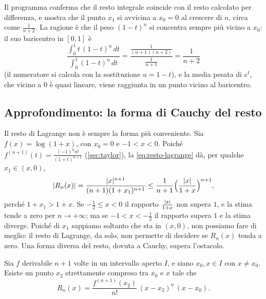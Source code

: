 Il programma conferma che il resto integrale coincide con il resto calcolato per
differenza, e mostra che il punto $x_{1}$ si avvicina a $x_{0}=0$ al crescere di $n$, circa
come $\frac1{n+2}$. La ragione è che il peso $(1-t)^{n}$ si concentra sempre più vicino a $x_{0}$:
il suo baricentro in $[0,1]$ è
\[
  \frac{\int_{0}^{1}t\,(1-t)^{n}\,dt}{\int_{0}^{1}(1-t)^{n}\,dt}=\frac{\frac1{(n+1)(n+2)}}{\frac1{n+1}}=\frac1{n+2}
\]
(il numeratore si calcola con la sostituzione $u=1-t$), e la media pesata di $e^{t}$, che
vicino a $0$ è quasi lineare, viene raggiunta in un punto vicino al baricentro.

\subsection{Approfondimento: la forma di Cauchy del resto}
\label{subsec:resto-cauchy}

Il resto di Lagrange non è sempre la forma più conveniente. Sia $f(x)=\log(1+x)$, con
$x_{0}=0$ e $-1<x<0$. Poiché $f^{(n+1)}(t)=\frac{(-1)^{n}n!}{(1+t)^{n+1}}$ (\cref{sec:taylor}), la
\eqref{eq:resto-lagrange} dà, per qualche $x_{1}\in(x,0)$,
\[
  \lvert R_{n}(x)\rvert=\frac{\lvert x\rvert^{n+1}}{(n+1)(1+x_{1})^{n+1}}
  \le\frac1{n+1}\Bigl(\frac{\lvert x\rvert}{1+x}\Bigr)^{n+1} ,
\]
perché $1+x_{1}>1+x$. Se $-\frac12\le x<0$ il rapporto $\frac{\lvert x\rvert}{1+x}$ non supera $1$, e la stima
tende a zero per $n\to+\infty$; ma se $-1<x<-\frac12$ il rapporto supera $1$ e la stima
diverge. Poiché di $x_{1}$ sappiamo soltanto che sta in $(x,0)$, non possiamo fare di
meglio: il resto di Lagrange, da solo, non permette di decidere se $R_{n}(x)$ tenda a zero.
Una forma diversa del resto, dovuta a Cauchy, supera l'ostacolo.

\begin{teorema}\label{teo:resto-cauchy}
Sia $f$ derivabile $n+1$ volte in un intervallo aperto $I$, e siano $x_{0},x\in I$ con
$x\neq x_{0}$. Esiste un punto $x_{2}$ strettamente compreso tra $x_{0}$ e $x$ tale che
\begin{equation}\label{eq:resto-cauchy}
  R_{n}(x)=\frac{f^{(n+1)}(x_{2})}{n!}\,(x-x_{2})^{n}\,(x-x_{0}) .
\end{equation}
\end{teorema}

\begin{schema}
\end{schema}

